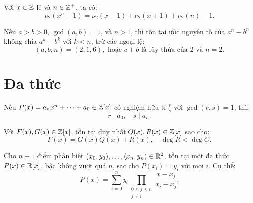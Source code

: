 \documentclass[../imo-training-open-book.tex]{subfiles}
\begin{document}
\vspace{1em}

\begin{theorem}
    \label{theorem:lte-even-difference}
    Với \( x \in \mathbb Z \) lẻ và \( n \in \mathbb Z^+ \), ta có:
    \[
        \nu_2(x^n - 1) = \nu_2(x - 1) + \nu_2(x + 1) + \nu_2(n) - 1.
    \]
\end{theorem}

\vspace{1em}

\begin{theorem}
    \label{theorem:zsigmondy}
    Nếu \( a > b > 0 \), \( \gcd(a, b) = 1 \), và \( n > 1 \), thì tồn tại ước nguyên tố của \( a^n - b^n \) không chia \( a^k - b^k \) với \( k < n \), trừ các ngoại lệ:
    \[
        (a, b, n) = (2, 1, 6), \text{ hoặc } a + b \text{ là lũy thừa của 2 và } n = 2.
    \]
\end{theorem}

\newpage

\section{Đa thức}

\begin{theorem}
    \label{theorem:rational-root-theorem}
    Nếu \( P(x) = a_nx^n + \dots + a_0 \in \mathbb Z[x] \) có nghiệm hữu tỉ \( \frac{r}{s} \) với \( \gcd(r,s) = 1 \), thì:
    \[
        r \mid a_0,\quad s \mid a_n.
    \]
\end{theorem}

\vspace{1em}

\begin{theorem}
    \label{theorem:polynomial-division}
    Với \( F(x), G(x) \in \mathbb Z[x] \), tồn tại duy nhất \( Q(x), R(x) \in \mathbb Z[x] \) sao cho:
    \[
        F(x) = G(x) Q(x) + R(x),\quad \deg R < \deg G.
    \]
\end{theorem}

\vspace{1em}

\begin{theorem}
    \label{theorem:lagrange-interpolation}
    Cho \( n+1 \) điểm phân biệt \( (x_0, y_0), \ldots, (x_n, y_n) \in \mathbb R^2 \), tồn tại một đa thức \( P(x) \in \mathbb R[x] \), bậc không vượt quá \( n \), sao cho \( P(x_i) = y_i \) với mọi \( i \). Cụ thể:
    \[
        P(x) = \sum_{i=0}^n y_i \prod_{\substack{0 \le j \le n \\ j \ne i}} \frac{x - x_j}{x_i - x_j}.
    \]
\end{theorem}
\end{document}
